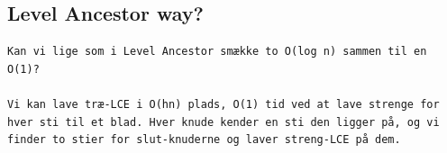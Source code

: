 \documentclass[a4]{article}
\begin{document}
\subsection{Level Ancestor way?}

\begin{verbatim}
Kan vi lige som i Level Ancestor smække to O(log n) sammen til en O(1)?

Vi kan lave træ-LCE i O(hn) plads, O(1) tid ved at lave strenge for hver sti til et blad. Hver knude kender en sti den ligger på, og vi finder to stier for slut-knuderne og laver streng-LCE på dem.
\end{verbatim}

\fi %

\end{document}
